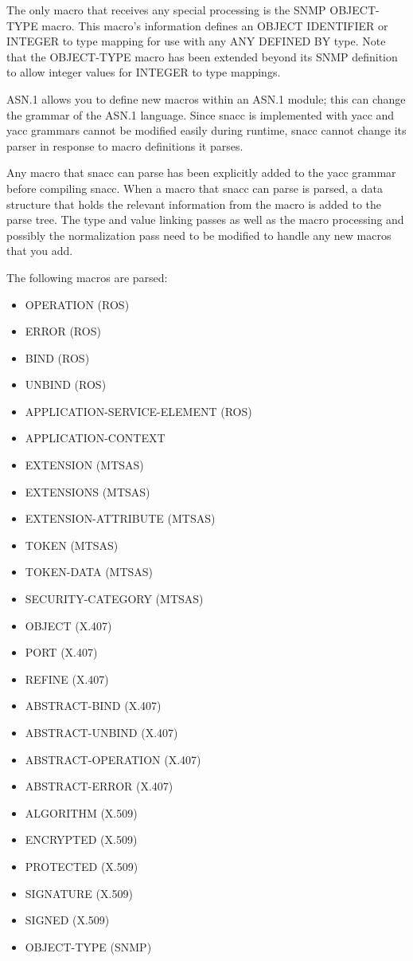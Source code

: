 The only macro that receives any special processing is the SNMP
OBJECT-TYPE macro.  This macro's information defines an OBJECT
IDENTIFIER or INTEGER to type mapping for use with any ANY DEFINED BY
type.  Note that the OBJECT-TYPE macro has been extended beyond its
SNMP definition to allow integer values for INTEGER to type mappings.

ASN.1 allows you to define new macros within an ASN.1 module;  this
can change the grammar of the ASN.1 language.  Since snacc is
implemented with {\ufn yacc} and yacc grammars cannot be modified
easily during runtime, snacc cannot change its parser in response to
macro definitions it parses.

Any macro that snacc can parse has been explicitly added to the yacc
grammar before compiling snacc.  When a macro that snacc can parse is
parsed, a data structure that holds the relevant information from the
macro is added to the parse tree.  The type and value linking passes
as well as the macro processing and possibly the normalization pass
need to be modified to handle any new macros that you add.

The following macros are parsed:

\begin{itemize}
\setlength{\itemsep}{0pt}
\setlength{\parsep}{0pt}
\item{ OPERATION (ROS) }
\item{ ERROR (ROS) }
\item{ BIND (ROS) }
\item{ UNBIND (ROS) }
\item{ APPLICATION-SERVICE-ELEMENT (ROS) }
\item{ APPLICATION-CONTEXT }
\item{ EXTENSION (MTSAS)}
\item{ EXTENSIONS (MTSAS) }
\item{ EXTENSION-ATTRIBUTE (MTSAS) }
\item{ TOKEN (MTSAS) }
\item{ TOKEN-DATA (MTSAS)}
\item{ SECURITY-CATEGORY (MTSAS) }
\item{ OBJECT (X.407) }
\item{ PORT   (X.407) }
\item{ REFINE (X.407)}
\item{ ABSTRACT-BIND (X.407) }
\item{ ABSTRACT-UNBIND (X.407) }
\item{ ABSTRACT-OPERATION (X.407) }
\item{ ABSTRACT-ERROR (X.407) }
\item{ ALGORITHM (X.509)}
\item{ ENCRYPTED (X.509)}
\item{ PROTECTED (X.509)}
\item{ SIGNATURE (X.509)}
\item{ SIGNED    (X.509)}
\item{ OBJECT-TYPE (SNMP) }
\end{itemize}


